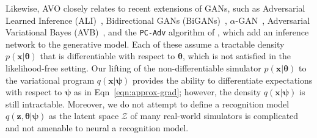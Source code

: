 \documentclass[twocolumn,superscriptaddress,aps]{revtex4-1}
\newcommand{\bftheta}{{\bm \theta}}
\newcommand{\bfpsi}{{\bm \psi}}
\newcommand{\bfphi}{{\bm \phi}}
\newcommand{\bfx}{\mathbf{x}}
\newcommand{\bfz}{\mathbf{z}}
\theoremstyle{plain}
\begin{document}
Likewise, AVO closely relates to recent extensions of GANs, such as
Adversarial Learned Inference (ALI)~\citep{dumoulin2016adversarially},
Bidirectional GANs (BiGANs)~\citep{donahue2016adversarial},
$\alpha$-GAN~\citep{rosca2017variational}, Adversarial Variational Bayes
(AVB)~\citep{DBLP:journals/corr/MeschederNG17}, and the \texttt{PC-Adv}
algorithm of  \citep{2017arXiv170208235H}, which
add an inference network to the generative model.  Each of these assume a
tractable density $p(\bfx|\bftheta)$ that is differentiable with respect to
$\bftheta$, which is  not satisfied in the likelihood-free setting. Our lifting
of the non-differentiable simulator $p(\bfx|\bftheta)$ to the variational
program $q(\bfx | \bfpsi)$ provides the ability to differentiate expectations
with respect to $\bfpsi$ as in Eqn~\ref{eqn:approx-grad}; however, the density
$q(\bfx | \bfpsi)$ is still intractable. Moreover, we do not attempt to define a
recognition model  $q(\bfz, \bftheta|\bfpsi)$ as the latent space $\mathcal{Z}$
of many real-world simulators is complicated and not amenable to neural a
recognition model.



\end{document}
